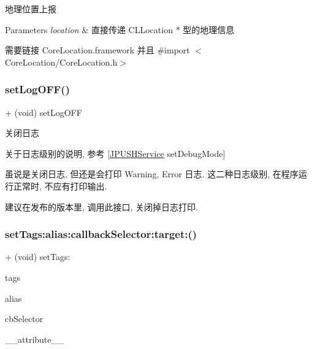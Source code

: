 地理位置上报


\begin{DoxyParams}{Parameters}
{\em location} & 直接传递 C\+L\+Location $\ast$ 型的地理信息\\
\hline
\end{DoxyParams}
需要链接 Core\+Location.\+framework 并且 \#import $<$Core\+Location/\+Core\+Location.\+h$>$ \mbox{\label{interface_j_p_u_s_h_service_a5e6a84cfe4e196798cc2af81eee2ec22}} 
\subsubsection{\texorpdfstring{set\+Log\+O\+F\+F()}{setLogOFF()}}
{\footnotesize\ttfamily + (void) set\+Log\+O\+FF \begin{DoxyParamCaption}{ }\end{DoxyParamCaption}}

关闭日志

关于日志级别的说明, 参考 \mbox{[}\mbox{\hyperlink{interface_j_p_u_s_h_service}{J\+P\+U\+S\+H\+Service}} set\+Debug\+Mode\mbox{]}

虽说是关闭日志, 但还是会打印 Warning, Error 日志. 这二种日志级别, 在程序运行正常时, 不应有打印输出.

建议在发布的版本里, 调用此接口, 关闭掉日志打印. \mbox{\label{interface_j_p_u_s_h_service_a9c53d751eccc46892d03a4cd50380ed4}} 
\subsubsection{\texorpdfstring{set\+Tags\+:alias\+:callback\+Selector\+:target\+:()}{setTags:alias:callbackSelector:target:()}}
{\footnotesize\ttfamily + (void) set\+Tags\+: \begin{DoxyParamCaption}\item[{(N\+S\+Set $\ast$)}]{tags }\item[{alias:(N\+S\+String $\ast$)}]{alias }\item[{callbackSelector:(S\+EL)}]{cb\+Selector }\item[{target:((deprecated(\char`\"{}J\+Push 2.\+1.\+1 版本已过期\char`\"{})))}]{\+\_\+\+\_\+attribute\+\_\+\+\_\+ }\end{DoxyParamCaption}}

